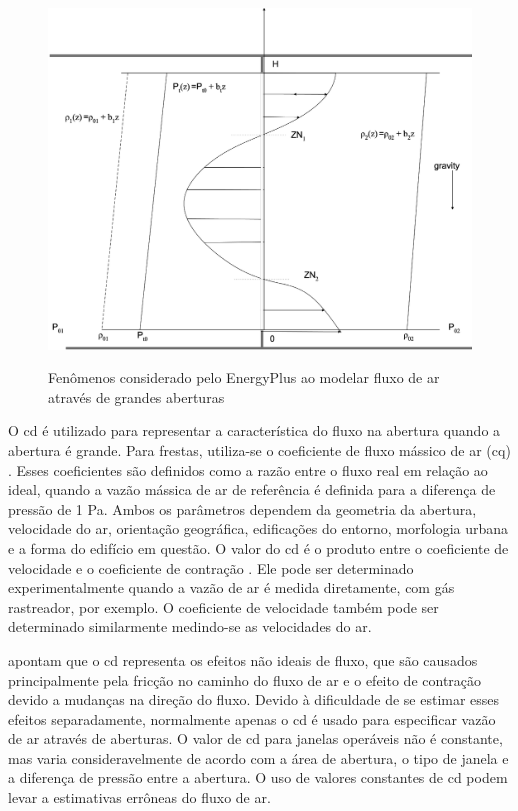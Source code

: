 \begin{figure}[h]
	\centering
	\caption{Fenômenos considerado pelo EnergyPlus ao modelar fluxo de ar através de grandes aberturas}
	\includegraphics[width=\figsize\linewidth]{img/detailed_opening.png}
	\label{fig:DetailedOpening}
\end{figure}

O \acrfull{cd} é utilizado para representar a característica do fluxo na abertura quando a abertura é grande. Para frestas, utiliza-se o coeficiente de fluxo mássico de ar (\acrshort{cq}) \cite{Arendt2017}.
Esses coeficientes são definidos como a razão entre o fluxo real em relação ao	ideal, quando a vazão mássica de ar de referência é definida para a diferença de pressão de 1 Pa. Ambos os parâmetros dependem da geometria da abertura, velocidade do ar, orientação geográfica, edificações do entorno, morfologia urbana e a forma do edifício em questão.
O valor do \acrshort{cd} é o produto entre o coeficiente de velocidade e o coeficiente de contração \cite{Flourentzou1998}. Ele pode ser determinado experimentalmente quando a vazão de ar é medida diretamente, com gás rastreador, por exemplo. O coeficiente de velocidade também pode ser determinado similarmente medindo-se as velocidades do ar.

 apontam que o \acrshort{cd} representa os efeitos não ideais de fluxo, que são causados principalmente pela fricção no caminho do fluxo de ar e o efeito de contração devido a mudanças na direção do fluxo. Devido à dificuldade de se estimar esses efeitos separadamente, normalmente apenas o \acrshort{cd} é usado para especificar vazão de ar através de aberturas. O valor de \acrshort{cd} para janelas operáveis não é constante, mas varia consideravelmente de acordo com a área de abertura, o tipo de janela e a diferença de pressão entre a abertura. O uso de valores constantes de \acrshort{cd} podem levar a estimativas errôneas do fluxo de ar.

